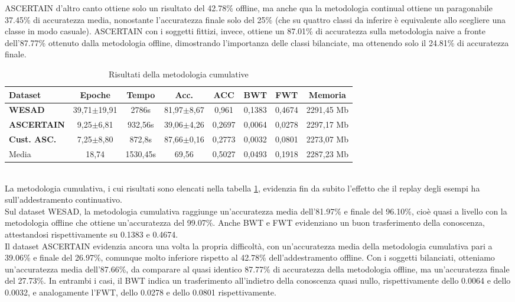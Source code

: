 ASCERTAIN d'altro canto ottiene solo un risultato del 42.78\% offline, ma anche qua la metodologia continual ottiene un paragonabile 37.45\% di accuratezza media, nonostante l'accuratezza finale solo del 25\% (che su quattro classi da inferire è equivalente allo scegliere una classe in modo casuale). ASCERTAIN con i soggetti fittizi, invece, ottiene un 87.01\% di accuratezza sulla metodologia naive a fronte dell'87.77\% ottenuto dalla metodologia offline, dimostrando l'importanza delle classi bilanciate, ma ottenendo solo il 24.81\% di accuratezza finale.
\begin{table}[h]
\footnotesize
    \begin{tabular}{l|c|c|c|c|c|c|c}
        \textbf{Dataset} & \textbf{Epoche} & \textbf{Tempo} & \textbf{Acc.} & \textbf{ACC} & \textbf{BWT} & \textbf{FWT} & \textbf{Memoria}\\
        \hline
        \textbf{WESAD} & 39,71$\pm$19,91 & 2786s & 81,97$\pm$8,67 & 0,961 & 0,1383 & 0,4674 & 2291,45 Mb\\
        \textbf{ASCERTAIN} & 9,25$\pm$6,81 & 932,56s & 39,06$\pm$4,26 & 0,2697 & 0,0064 & 0,0278 & 2297,17 Mb\\
        \textbf{Cust. ASC.} & 7,25$\pm$8,80 & 872,8s & 87,66$\pm$0,16 & 0,2773 & 0,0032 & 0,0801 & 2273,07 Mb\\
        \hline
        Media & 18,74 & 1530,45s & 69,56 & 0,5027 & 0,0493 & 0,1918 & 2287,23 Mb
    \end{tabular}
    \caption{Risultati della metodologia cumulative}
    \label{tab:rescumulative}
\end{table}\\
La metodologia cumulativa, i cui risultati sono elencati nella tabella \ref{tab:rescumulative}, evidenzia fin da subito l'effetto che il replay degli esempi ha sull'addestramento continuativo.\\
Sul dataset WESAD, la metodologia cumulativa raggiunge un'accuratezza media dell'81.97\% e finale del 96.10\%, cioè quasi a livello con la metodologia offline che ottiene un'accuratezza del 99.07\%. Anche BWT e FWT evidenziano un buon trasferimento della conoscenza, attestandosi rispettivamente su 0.1383 e 0.4674.\\
Il dataset ASCERTAIN evidenzia ancora una volta la propria difficoltà, con un'accuratezza media della metodologia cumulativa pari a 39.06\% e finale del 26.97\%, comunque molto inferiore rispetto al 42.78\% dell'addestramento offline. Con i soggetti bilanciati, otteniamo un'accuratezza media dell'87.66\%, da comparare al quasi identico 87.77\% di accuratezza della metodologia offline, ma un'accuratezza finale del 27.73\%. In entrambi i casi, il BWT indica un trasferimento all'indietro della conoscenza quasi nullo, rispettivamente dello 0.0064 e dello 0.0032, e analogamente l'FWT, dello 0.0278 e dello 0.0801 rispettivamente.
